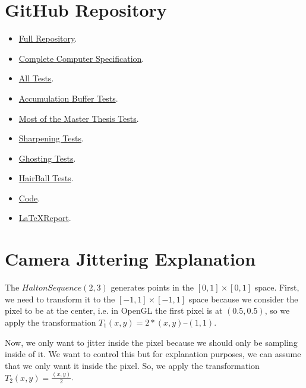 \documentclass{cslthse-msc}
\begin{document}

\begin{appendices}
\chapter{GitHub Repository}
\begin{itemize}
	\item \href{https://github.com/maniatic0/Christian-TRAA}{Full Repository}.
	\item \href{https://github.com/maniatic0/Christian-TRAA/tree/master/PC\%20Specification}{Complete Computer Specification}.
	\item \href{https://github.com/maniatic0/Christian-TRAA/tree/master/Important\%20Tests}{All Tests}.
	\item \href{https://github.com/maniatic0/Christian-TRAA/tree/master/Important\%20Tests/Accumulation\%20Buffer\%20Tests}{Accumulation Buffer Tests}.
	\item \href{https://github.com/maniatic0/Christian-TRAA/tree/master/Important\%20Tests/Master\%20Thesis\%20Tests}{Most of the Master Thesis Tests}.
	\item \href{https://github.com/maniatic0/Christian-TRAA/tree/master/Important\%20Tests/Sharpening\%20Tests}{Sharpening Tests}.
	\item \href{https://github.com/maniatic0/Christian-TRAA/tree/master/Important\%20Tests/Ghosting}{Ghosting Tests}.
	\item \href{https://github.com/maniatic0/Christian-TRAA/tree/master/Important\%20Tests/HairBall}{HairBall Tests}.
	\item \href{https://github.com/maniatic0/Christian-TRAA/tree/master/CG_Labs}{Code}.
	\item \href{https://github.com/maniatic0/Christian-TRAA/tree/master/LaTeX/Master_Thesis}{\LaTeX Report}.
\end{itemize}
\chapter{Camera Jittering Explanation} \label{appendix:jitter}
The $Halton Sequence (2, 3)$ generates points in the $[0,1]\times [0,1]$ space. First, we need to transform it to the $[-1,1]\times [-1,1]$ space because we consider the pixel to be at the center, i.e. in OpenGL the first pixel is at $(0.5, 0.5)$, so we apply the transformation $T_1(x, y) = 2 * (x, y) – (1, 1)$.

Now, we only want to jitter inside the pixel because we should only be sampling inside of it. We want to control this but for explanation purposes, we can assume that we only want it inside the pixel. So, we apply the transformation $T_2(x, y) = \frac{(x, y)}{2}$.


\end{appendices}
\end{document}
